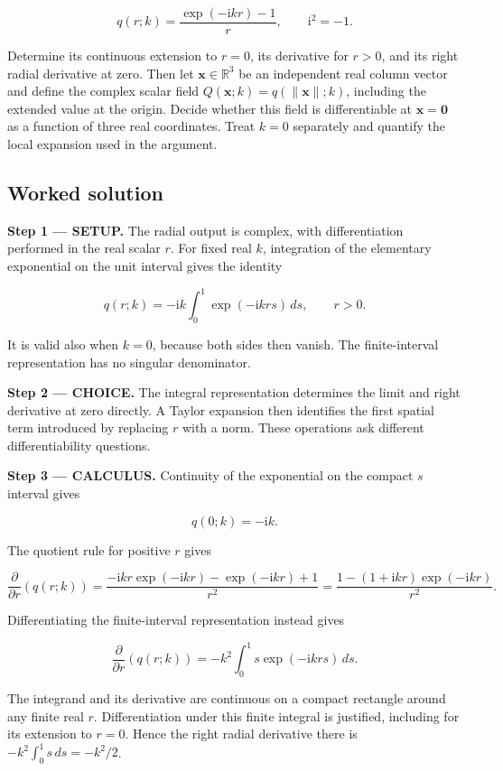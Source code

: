 \documentclass[11pt,oneside,openany]{book}
\begin{document}
\[
q(r;k)=\frac{\exp(-\mathrm{i}kr)-1}{r},\qquad \mathrm{i}^2=-1.
\]

Determine its continuous extension to \(r=0\), its derivative for \(r>0\), and its right radial derivative at zero. Then let \(\mathbf x\in\mathbb R^3\) be an independent real column vector and define the complex scalar field \(Q(\mathbf x;k)=q(\|\mathbf x\|;k)\), including the extended value at the origin. Decide whether this field is differentiable at \(\mathbf x=\mathbf0\) as a function of three real coordinates. Treat \(k=0\) separately and quantify the local expansion used in the argument.
\subsection*{Worked solution}

\textbf{Step 1 --- SETUP.} The radial output is complex, with differentiation performed in the real scalar \(r\). For fixed real \(k\), integration of the elementary exponential on the unit interval gives the identity

\[
q(r;k)=-\mathrm{i}k\int_0^1\exp(-\mathrm{i}krs)\,ds,
\qquad r>0.
\]

It is valid also when \(k=0\), because both sides then vanish. The finite-interval representation has no singular denominator.

\begin{ChoiceStep}
\textbf{Step 2 --- CHOICE.} The integral representation determines the limit and right derivative at zero directly. A Taylor expansion then identifies the first spatial term introduced by replacing \(r\) with a norm. These operations ask different differentiability questions.

\end{ChoiceStep}
\textbf{Step 3 --- CALCULUS.} Continuity of the exponential on the compact \(s\) interval gives

\[
q(0;k)=-\mathrm{i}k.
\]

The quotient rule for positive \(r\) gives

\[
\frac{\partial}{\partial r}\left(q(r;k)\right)
=\frac{-\mathrm{i}kr\exp(-\mathrm{i}kr)-\exp(-\mathrm{i}kr)+1}{r^2}
=\frac{1-(1+\mathrm{i}kr)\exp(-\mathrm{i}kr)}{r^2}.
\]

Differentiating the finite-interval representation instead gives

\[
\frac{\partial}{\partial r}\left(q(r;k)\right)
=-k^2\int_0^1s\exp(-\mathrm{i}krs)\,ds.
\]

The integrand and its derivative are continuous on a compact rectangle around any finite real \(r\). Differentiation under this finite integral is justified, including for its extension to \(r=0\). Hence the right radial derivative there is \(-k^2\int_0^1s\,ds=-k^2/2\).
\end{document}
